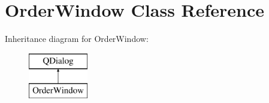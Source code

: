 \hypertarget{class_order_window}{}\section{Order\+Window Class Reference}
\label{class_order_window}
Inheritance diagram for Order\+Window\+:\begin{figure}[H]
\begin{center}
\leavevmode
\includegraphics[height=2.000000cm]{class_order_window}
\end{center}
\end{figure}
